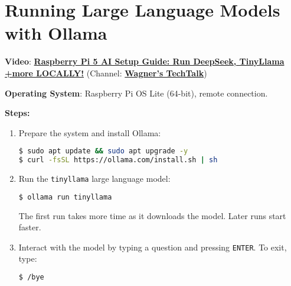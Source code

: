 \section{Running Large Language Models with Ollama}

\noindent \textbf{Video}: \href{https://www.youtube.com/watch?v=nNxtQhz1b2M}{\textbf{\color{blue}Raspberry Pi 5 AI Setup Guide: Run DeepSeek, TinyLlama +more LOCALLY!}} (Channel: \href{https://www.youtube.com/@WagnersTechTalk}{\textbf{\color{blue}Wagner's TechTalk}})

\vspace{0.5cm}

\noindent \textbf{Operating System}: Raspberry Pi OS Lite (64-bit), remote connection.

\vspace{0.5cm}

\noindent \textbf{Steps:}
\begin{enumerate}
\item Prepare the system and install Ollama:
\begin{lstlisting}[language=bash, breaklines=true, breakatwhitespace=true, columns=fullflexible]
$ sudo apt update && sudo apt upgrade -y
$ curl -fsSL https://ollama.com/install.sh | sh
\end{lstlisting}

\item Run the \texttt{tinyllama} large language model:

\begin{lstlisting}[language=bash, breaklines=true, breakatwhitespace=true, columns=fullflexible]
$ ollama run tinyllama
\end{lstlisting}

The first run takes more time as it downloads the model. Later runs start faster.

\item Interact with the model by typing a question and pressing \texttt{ENTER}. To exit, type:
\begin{lstlisting}[language=bash, breaklines=true, breakatwhitespace=true, columns=fullflexible]
$ /bye
\end{lstlisting}

\end{enumerate}

